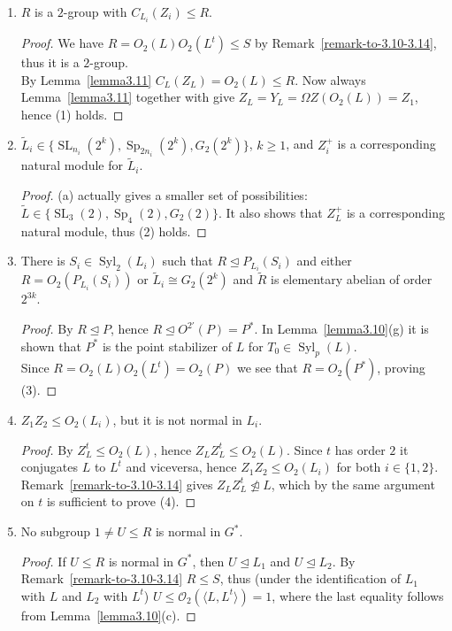 \documentclass{amsart}
\numberwithin{equation}{section}
\theoremstyle{definition}
\theoremstyle{subresult}
\theoremstyle{caseresult}
\newcommand{\coll}{\mathcal{O}}
\newcommand{\Syl}{\operatorname{Syl}}
\newcommand{\SL}{\operatorname{SL}}
\newcommand{\Sp}{\operatorname{Sp}}
\newcommand{\norm}{\trianglelefteq}
\newcommand{\wde}{\widetilde}
\newcommand{\<}{\langle}
\renewcommand{\>}{\rangle}
\begin{document}
\begin{enumerate}[label=(\arabic*)]
	\item $R$ is a $2$-group with $C_{L_i}(Z_i) \le R$.
	\begin{proof}
		We have $R = O_2(L)O_2(L^t) \le S$ by Remark~\ref{remark-to-3.10-3.14}, thus it is a $2$-group.\\
		By Lemma~\ref{lemma3.11} $C_L(Z_L) = O_2(L) \le R$. Now always Lemma~\ref{lemma3.11} together with \cite[Lemma 3.36]{Meier-Stell-Stroth:2012} give $Z_L = Y_L = \Omega Z(O_2(L)) = Z_1$, hence (1) holds.
	\end{proof}
	\item $\wde{L}_i \in \{\SL_{n_i}(2^k), \Sp_{2n_i}(2^k), G_2(2^k)\}$, $k \ge 1$, and $Z_i^+$ is a corresponding natural module for $\wde{L}_i$.
	\begin{proof}
		\cite[Lemma 3.23]{Meier-Stell-Stroth:2012}(a) actually gives a smaller set of possibilities: $\wde{L} \in \{\SL_3(2), \Sp_4(2), G_2(2)\}$. It also shows that $Z_L^+$ is a corresponding natural module, thus (2) holds.
	\end{proof}
	\item There is $S_i \in \Syl_2(L_i)$ such that $R \norm P_{L_i}(S_i)$ and either $R = O_2(P_{L_i}(S_i))$ or $\wde{L}_i \cong G_2(2^k)$ and $\wde{R}$ is elementary abelian of order $2^{3k}$.
	\begin{proof}
		By \cite[Lemma 3.14(c)]{Meier-Stell-Stroth:2012} $R \norm P$, hence $R \norm O^{2'}(P)=P^*$. In Lemma~\ref{lemma3.10}(g) it is shown that $P^*$ is the point stabilizer of $L$ for $T_0 \in \Syl_p(L)$.\\
		Since $R = O_2(L)O_2(L^t) = O_2(P)$ we see that $R=O_2(P^*)$, proving (3).
	\end{proof}
	\item $Z_1Z_2 \le O_2(L_i)$, but it is not normal in $L_i$.
	\begin{proof}
		By \cite[Lemma 3.27]{Meier-Stell-Stroth:2012} $Z_L^t \le O_2(L)$, hence $Z_L Z_L^t \le O_2(L)$. Since $t$ has order $2$ it conjugates $L$ to $L^t$ and viceversa, hence $Z_1Z_2 \le O_2(L_i)$ for both $i \in \{1,2\}$. Remark~\ref{remark-to-3.10-3.14} gives $Z_LZ_L^t \not \norm L$, which by the same argument on $t$ is sufficient to prove (4).
	\end{proof}
	\item No subgroup $1 \ne U \le R$ is normal in $G^*$.
	\begin{proof}
		If $U \le R$ is normal in $G^*$, then $U \norm L_1$ and $U \norm L_2$. By Remark~\ref{remark-to-3.10-3.14} $R \le S$, thus (under the identification of $L_1$ with $L$ and $L_2$ with $L^t$) $U \le \coll_2(\<L,L^t\>) = 1$, where the last equality follows from Lemma~\ref{lemma3.10}(c).
	\end{proof}
\end{enumerate}
\end{document}
